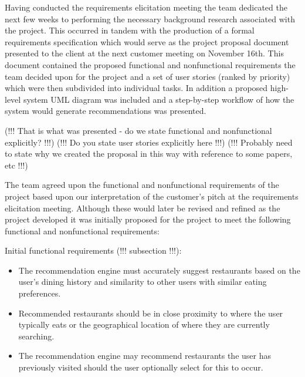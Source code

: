 \documentclass{l3proj}
\begin{document}



Having conducted the requirements elicitation meeting the team dedicated the next few weeks to performing the necessary background research associated with the project. This occurred in tandem with the production of a formal requirements specification which would serve as the project proposal document presented to the client at the next customer meeting on November 16th. This document contained the proposed functional and nonfunctional requirements the team decided upon for the project and a set of user stories (ranked by priority) which were then subdivided into individual tasks. In addition a proposed high-level system UML diagram was included and a step-by-step workflow of how the system would generate recommendations was presented. 

(!!! That is what was presented - do we state functional and nonfunctional explicitly? !!!)
(!!! Do you state user stories explicitly here !!!)
(!!! Probably need to state why we created the proposal in this way with reference to some papers, etc !!!)

The team agreed upon the functional and nonfunctional requirements of the project based upon our interpretation of the customer’s pitch at the requirements elicitation meeting. Although these would later be revised and refined as the project developed it was initially proposed for the project to meet the following functional and nonfunctional requirements:

Initial functional requirements (!!! subsection !!!):
\begin{itemize}
\item The recommendation engine must accurately suggest restaurants based on the user’s dining history and similarity to other users with similar eating preferences.
\item Recommended restaurants should be in close proximity to where the user typically eats or the geographical location of where they are currently searching.
\item The recommendation engine may recommend restaurants the user has previously visited should the user optionally select for this to occur.
\end{itemize}
\end{document}

